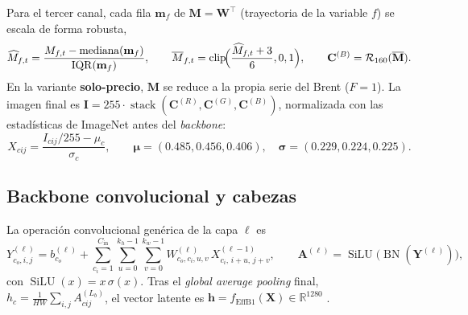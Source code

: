 \documentclass[11pt,a4paper]{article}
\begin{document}
Para el tercer canal, cada fila $\mathbf{m}_f$ de
$\mathbf{M}=\mathbf{W}^{\top}$ (trayectoria de la variable $f$) se escala de
forma robusta,
\begin{equation}
\widehat M_{f,t} = \frac{M_{f,t} - \operatorname{mediana}(\mathbf{m}_f)}
{\operatorname{IQR}(\mathbf{m}_f)},
\qquad
\overline M_{f,t} = \operatorname{clip}\!\Bigl(\frac{\widehat M_{f,t}+3}{6},0,1\Bigr),
\qquad
\mathbf{C}^{(B)} = \mathcal{R}_{160}(\overline{\mathbf{M}}).
\end{equation}
En la variante \textbf{solo-precio}, $\mathbf{M}$ se reduce a la propia serie del
Brent ($F=1$). La imagen final es
$\mathbf{I} = 255\cdot\operatorname{stack}(\mathbf{C}^{(R)},\mathbf{C}^{(G)},
\mathbf{C}^{(B)})$, normalizada con las estadísticas de ImageNet antes del
\emph{backbone}:
\begin{equation}
X_{cij} = \frac{I_{cij}/255 - \mu_c}{\sigma_c},
\qquad
\boldsymbol{\mu}=(0.485,0.456,0.406),\quad
\boldsymbol{\sigma}=(0.229,0.224,0.225).
\end{equation}

\subsection{Backbone convolucional y cabezas}
La operación convolucional genérica de la capa $\ell$ es
\begin{equation}
Y^{(\ell)}_{c_o,i,j} = b^{(\ell)}_{c_o} +
\sum_{c_i=1}^{C_{\mathrm{in}}}\sum_{u=0}^{k_h-1}\sum_{v=0}^{k_w-1}
W^{(\ell)}_{c_o,c_i,u,v}\,X^{(\ell-1)}_{c_i,\,i+u,\,j+v},
\qquad
\mathbf{A}^{(\ell)} = \operatorname{SiLU}\bigl(\operatorname{BN}(\mathbf{Y}^{(\ell)})\bigr),
\end{equation}
con $\operatorname{SiLU}(x)=x\,\sigma(x)$. Tras el \emph{global average pooling}
final, $h_c = \frac{1}{HW}\sum_{i,j} A^{(L_b)}_{cij}$, el vector latente es
$\mathbf{h}=f_{\mathrm{EffB1}}(\mathbf{X})\in\mathbb{R}^{1280}$
\cite{tan2019efficientnet}.
\end{document}
